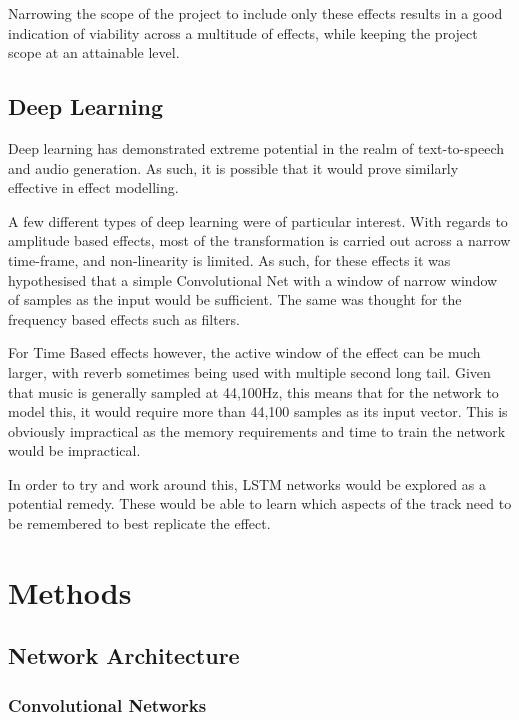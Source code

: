 \documentclass{l4proj}
\begin{document}
Narrowing the scope of the project to include only these effects results
in a good indication of viability across a multitude of effects, while
keeping the project scope at an attainable level.

\hypertarget{deep-learning}{%
\section{Deep Learning}\label{deep-learning}}

Deep learning has demonstrated extreme potential in the realm of
text-to-speech and audio generation. As such, it is possible that it
would prove similarly effective in effect modelling.

A few different types of deep learning were of particular interest. With
regards to amplitude based effects, most of the transformation is
carried out across a narrow time-frame, and non-linearity is limited. As
such, for these effects it was hypothesised that a simple Convolutional
Net with a window of narrow window of samples as the input would be
sufficient. The same was thought for the frequency based effects such as
filters.

For Time Based effects however, the active window of the effect can be
much larger, with reverb sometimes being used with multiple second long
tail. Given that music is generally sampled at 44,100Hz, this means that
for the network to model this, it would require more than 44,100 samples
as its input vector. This is obviously impractical as the memory
requirements and time to train the network would be impractical.

In order to try and work around this, LSTM networks would be explored as
a potential remedy. These would be able to learn which aspects of the
track need to be remembered to best replicate the effect.

\hypertarget{methods}{%
\chapter{Methods}\label{methods}}

\hypertarget{network-architecture}{%
\section{Network Architecture}\label{network-architecture}}

\hypertarget{convolutional-networks}{%
\subsection{Convolutional Networks}\label{convolutional-networks}}
\end{document}
